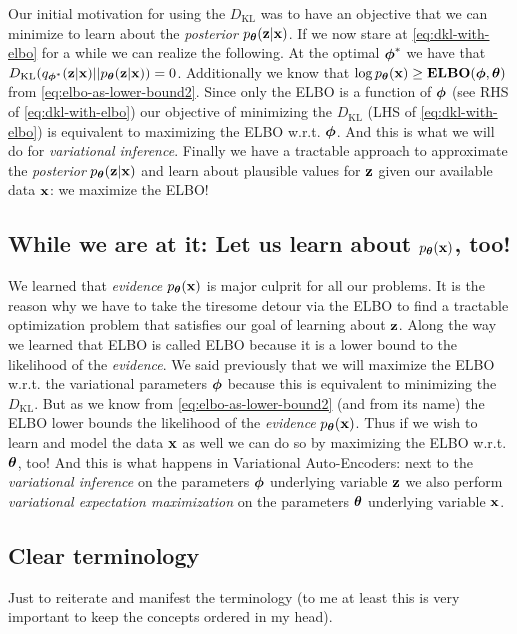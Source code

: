 \documentclass[11pt]{article}
\theoremstyle{definition}
\begin{document}
\par 
Our initial motivation for using the $D_\text{KL}$ was to have an objective that we can minimize to learn about the \textit{posterior} $p_{\boldsymbol{\theta}}(\mathbf{z}|\mathbf{x})$. If we now stare at \autoref{eq:dkl-with-elbo} for a while we can realize the following. At the optimal $\boldsymbol{\phi}^*$ we have that $	D_{\text{KL}}(q_{\boldsymbol{\phi}^*}(\mathbf{z}|\mathbf{x})||p_{\boldsymbol{\theta}}(\mathbf{z}|\mathbf{x})) = 0$. Additionally we know that $\log p_{\boldsymbol{\theta}}(\mathbf{x}) \geq \mathbf{ELBO}(\boldsymbol{\phi}, \boldsymbol{\theta})$ from \autoref{eq:elbo-as-lower-bound2}. Since only the ELBO is a function of $\boldsymbol{\phi}$ (see RHS of \autoref{eq:dkl-with-elbo}) our objective of minimizing the $D_{\text{KL}}$ (LHS of \autoref{eq:dkl-with-elbo}) is equivalent to maximizing the ELBO w.r.t. $\boldsymbol{\phi}$. And this is what we will do for \textit{variational inference}. Finally we have a tractable approach to approximate the \textit{posterior} $p_{\boldsymbol{\theta}}(\mathbf{z}|\mathbf{x})$ and learn about plausible values for $\mathbf{z}$ given our available data $\mathbf{x}$: we maximize the ELBO!

\subsection{While we are at it: Let us learn about $p_{\boldsymbol{\theta}}(\mathbf{x})$, too! }
We learned that \textit{evidence}  $p_{\boldsymbol{\theta}}(\mathbf{x})$ is major culprit for all our problems. It is the reason why we have to take the tiresome detour via the ELBO to find a tractable optimization problem that satisfies our goal of learning about $\mathbf{z}$. Along the way we learned that ELBO is called ELBO because it is a lower bound to the likelihood of the \textit{evidence}. We said previously that we will maximize the ELBO w.r.t. the variational parameters $\boldsymbol{\phi}$ because this is equivalent to minimizing the $D_{\text{KL}}$. But as we know from \autoref{eq:elbo-as-lower-bound2} (and from its name) the ELBO lower bounds the likelihood of the \textit{evidence}  $p_{\boldsymbol{\theta}}(\mathbf{x})$. Thus if we wish to learn and model the data $\mathbf{x}$ as well we can do so by maximizing the ELBO w.r.t. $\boldsymbol{\theta}$, too! And this is what happens in Variational Auto-Encoders: next to the \textit{variational inference} on the parameters $\boldsymbol{\phi}$ underlying variable $\mathbf{z}$ we also perform \textit{variational expectation maximization} on the parameters $\boldsymbol{\theta}$ underlying variable $\mathbf{x}$.

\subsection{Clear terminology}
Just to reiterate and manifest the terminology (to me at least this is very important to keep the concepts ordered in my head).
\end{document}
